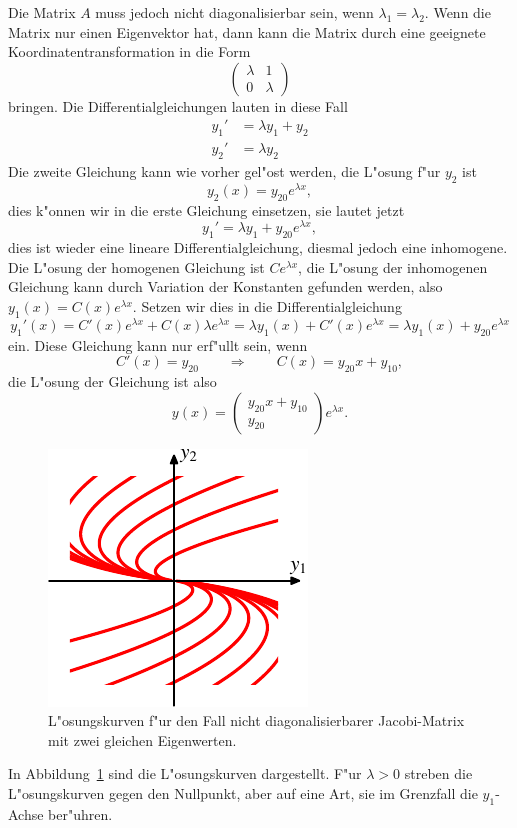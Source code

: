 Die Matrix $A$ muss jedoch nicht diagonalisierbar sein, wenn
$\lambda_1=\lambda_2$.
Wenn die Matrix nur einen Eigenvektor hat, dann kann die Matrix
durch eine geeignete Koordinatentransformation in die Form
\[
\begin{pmatrix}
\lambda&      1\\
      0&\lambda
\end{pmatrix}
\]
bringen.
Die Differentialgleichungen lauten in diese Fall
\begin{align*}
y_1'&=\lambda y_1 + y_2\\
y_2'&=\lambda y_2
\end{align*}
Die zweite Gleichung kann wie vorher gel"ost werden, die L"osung f"ur $y_2$
ist
\[
y_2(x)=y_{20}e^{\lambda x},
\]
dies k"onnen wir in die erste Gleichung einsetzen, sie lautet jetzt
\[
y_1' = \lambda y_1 + y_{20}e^{\lambda x},
\]
dies ist wieder eine lineare Differentialgleichung, diesmal jedoch
eine inhomogene. 
Die L"osung der homogenen Gleichung ist $Ce^{\lambda x}$, die L"osung
der inhomogenen Gleichung kann durch Variation der Konstanten gefunden
werden, also $y_1(x)=C(x)e^{\lambda x}$.
Setzen wir dies in die Differentialgleichung 
\[
y_1'(x)
=
C'(x)e^{\lambda x}+C(x)\lambda e^{\lambda x}
=
\lambda y_1(x) + C'(x)e^{\lambda x}
=
\lambda y_1(x) + y_{20}e^{\lambda x}
\]
ein.
Diese Gleichung kann nur erf"ullt sein, wenn
\[
C'(x)=y_{20}
\qquad\Rightarrow\qquad
C(x)=y_{20}x+y_{10},
\]
die L"osung der Gleichung ist also
\[
y(x)=\begin{pmatrix}
y_{20}x+y_{10}\\
y_{20}
\end{pmatrix}e^{\lambda x}.
\]
\begin{figure}
\centering
\includegraphics{chapters/images/geometrie-8.pdf}
\caption{L"osungskurven f"ur den Fall nicht diagonalisierbarer Jacobi-Matrix
mit zwei gleichen Eigenwerten.
\label{geometrie:jnf-kurven}}
\end{figure}%
In Abbildung~\ref{geometrie:jnf-kurven} sind die L"osungskurven dargestellt.
F"ur $\lambda >0$ streben die L"osungskurven gegen den Nullpunkt, aber auf
eine Art, sie im Grenzfall die $y_1$-Achse ber"uhren.

